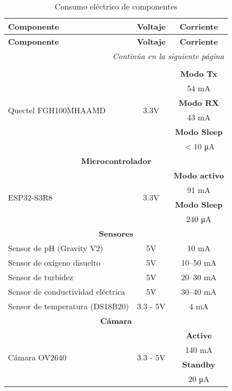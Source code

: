 \renewcommand{\arraystretch}{1.4}
\begin{longtable}{|p{5cm}|c|c|}
\caption{Consumo eléctrico de componentes}
\label{tab:componentes_energia} \\
\hline
\textbf{Componente} & \textbf{Voltaje} & \textbf{Corriente} \\
\hline
\endfirsthead

\hline
\textbf{Componente} & \textbf{Voltaje} & \textbf{Corriente} \\
\hline
\endhead

\hline
\multicolumn{3}{r}{\textit{Continúa en la siguiente página}} \\
\endfoot

\hline
\endlastfoot

\multicolumn{3}{|c|}{\textbf{Transceptor}} \\
\hline
\multirow{6}{*}{Quectel FGH100MHAAMD}& \multirow{6}{*}{3.3V} & \textbf{Modo Tx}\\
     &  & 54 \unit{\mA} \\ \cline{3-3}
     &  & \textbf{Modo RX} \\
     &  & 43 \unit{\mA} \\ \cline{3-3}
     &  & \textbf{Modo Sleep} \\
     &  & $<10$ \unit{\uA} \\
\hline

\multicolumn{3}{|c|}{\textbf{Microcontrolador}} \\
\hline
\multirow{4}{*}{ESP32-S3R8} & \multirow{4}{*}{3.3V} & \textbf{Modo activo} \\
   &  & 91 \unit{\mA} \\ \cline{3-3}
   &  & \textbf{Modo Sleep} \\
   &  & 240 \unit{\uA} \\
\hline

\multicolumn{3}{|c|}{\textbf{Sensores}} \\
\hline
Sensor de pH (Gravity V2)                & 5V         & 10 \unit{\mA} \\
Sensor de oxígeno disuelto               & 5V         & 10–50 \unit{\mA} \\
Sensor de turbidez                       & 5V         & 20–30 \unit{\mA} \\
Sensor de conductividad eléctrica        & 5V         & 30–40 \unit{\mA} \\
Sensor de temperatura (DS18B20)          & 3.3 - 5V   & 4 \unit{\mA} \\
\hline

\multicolumn{3}{|c|}{\textbf{Cámara}} \\
\hline
\multirow{4}{*}{Cámara OV2640}           & \multirow{4}{*}{3.3 - 5V} & \textbf{Active}  \\
& & 140 \unit{\mA}\\
                                         &                           & \textbf{Standby}  \\
& & 20 \unit{\uA} \\                                        
\hline
\end{longtable}
